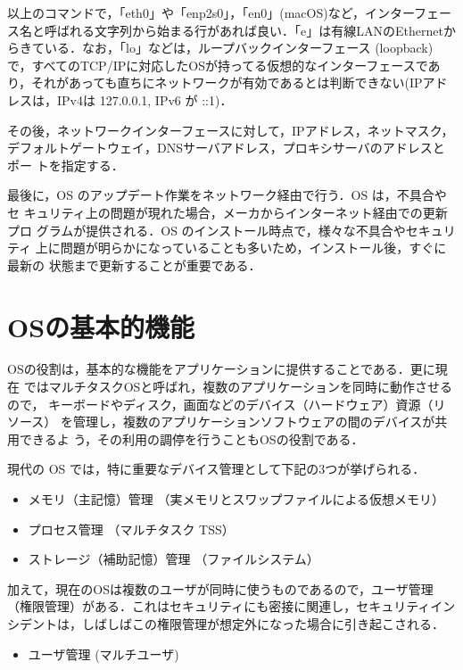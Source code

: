 以上のコマンドで，「eth0」や「enp2s0」，「en0」(macOS)など，インターフェース名と呼ばれる文字列から始まる行があれば良い．「e」は有線LANのEthernetからきている．なお，「lo」などは，ループバックインターフェース (loopback) で，すべてのTCP/IPに対応したOSが持ってる仮想的なインターフェースであり，それがあっても直ちにネットワークが有効であるとは判断できない(IPアドレスは，IPv4は 127.0.0.1, IPv6 が ::1)．

その後，ネットワークインターフェースに対して，IPアドレス，ネットマスク，
デフォルトゲートウェイ，DNSサーバアドレス，プロキシサーバのアドレスとポー
トを指定する．

最後に，OS のアップデート作業をネットワーク経由で行う．OS は，不具合やセ
キュリティ上の問題が現れた場合，メーカからインターネット経由での更新プロ
グラムが提供される．OS のインストール時点で，様々な不具合やセキュリティ
上に問題が明らかになっていることも多いため，インストール後，すぐに最新の
状態まで更新することが重要である．

\section{OSの基本的機能}

OSの役割は，基本的な機能をアプリケーションに提供することである．更に現在
ではマルチタスクOSと呼ばれ，複数のアプリケーションを同時に動作させるので，
キーボードやディスク，画面などのデバイス（ハードウェア）資源（リソース）
を管理し，複数のアプリケーションソフトウェアの間のデバイスが共用できるよ
う，その利用の調停を行うこともOSの役割である．

現代の OS では，特に重要なデバイス管理として下記の3つが挙げられる．
\begin{itemize}
 \item メモリ（主記憶）管理 （実メモリとスワップファイルによる仮想メモリ）
 \item プロセス管理 （マルチタスク TSS）
 \item ストレージ（補助記憶）管理 （ファイルシステム）
\end{itemize}

加えて，現在のOSは複数のユーザが同時に使うものであるので，ユーザ管理（権限管理）がある．これはセキュリティにも密接に関連し，セキュリティインシデントは，しばしばこの権限管理が想定外になった場合に引き起こされる．

\begin{itemize}
    \item ユーザ管理 (マルチユーザ)
\end{itemize}

